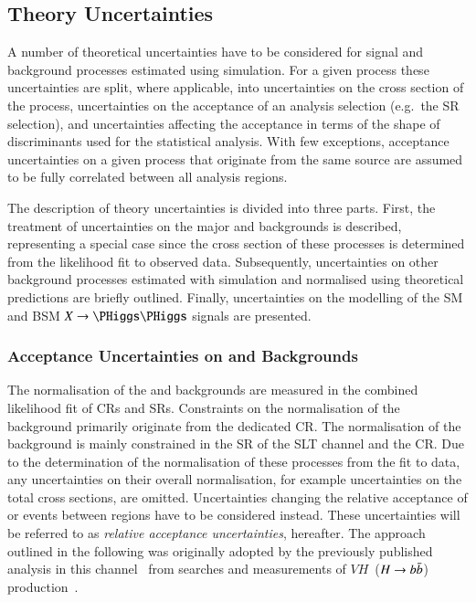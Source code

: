 \subsection{Theory Uncertainties}%
\label{sec:modelling_uncertainties}%
\label{sec:theory_uncertainties}

A number of theoretical uncertainties have to be considered for signal and
background processes estimated using simulation. For a given process these
uncertainties are split, where applicable, into uncertainties on the cross
section of the process, uncertainties on the acceptance of an analysis selection
(e.g.\ the SR selection), and uncertainties affecting the acceptance in terms of
the shape of discriminants used for the statistical analysis. With few
exceptions, acceptance uncertainties on a given process that originate from the
same source are assumed to be fully correlated between all analysis regions.

The description of theory uncertainties is divided into three parts.  First, the
treatment of uncertainties on the major \ZHF and \ttbar backgrounds is
described, representing a special case since the cross section of these
processes is determined from the likelihood fit to observed data. Subsequently,
uncertainties on other background processes estimated with simulation and
normalised using theoretical predictions are briefly outlined. Finally,
uncertainties on the modelling of the SM \HH and BSM $X \to \HH$ signals are
presented.

\subsubsection{Acceptance Uncertainties on \ZHF and \ttbar Backgrounds}

The normalisation of the \ZHF and \ttbar backgrounds are measured in the
combined likelihood fit of CRs and SRs. Constraints on the normalisation of the
\ZHF background primarily originate from the dedicated CR. The normalisation of
the \ttbar background is mainly constrained in the SR of the \lephad SLT channel
and the \ZHF CR. Due to the determination of the normalisation of these
processes from the fit to data, any uncertainties on their overall
normalisation, for example uncertainties on the total cross sections, are
omitted. Uncertainties changing the relative acceptance of \ZHF or \ttbar events
between regions have to be considered instead. These uncertainties will be
referred to as \emph{relative acceptance uncertainties}, hereafter. The approach
outlined in the following was originally adopted by the previously published
analysis in this channel~\cite{HIGG-2016-16-witherratum} from searches and
measurements of $VH$~($H\to b\bar{b}$)
production~\cite{HIGG-2016-29,HIGG-2018-04,HIGG-2018-51}.

